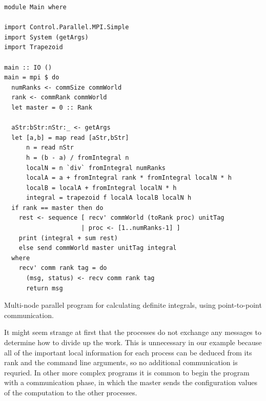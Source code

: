 \documentclass{tmr}
\newcommand{\Todo}[1]{{\textbf{Todo: #1}}}
\begin{document}
\begin{listing}
\begin{Verbatim}
module Main where

import Control.Parallel.MPI.Simple
import System (getArgs)
import Trapezoid

main :: IO ()
main = mpi $ do
  numRanks <- commSize commWorld
  rank <- commRank commWorld
  let master = 0 :: Rank

  aStr:bStr:nStr:_ <- getArgs
  let [a,b] = map read [aStr,bStr]
      n = read nStr
      h = (b - a) / fromIntegral n
      localN = n `div` fromIntegral numRanks
      localA = a + fromIntegral rank * fromIntegral localN * h
      localB = localA + fromIntegral localN * h
      integral = trapezoid f localA localB localN h
  if rank == master then do
    rest <- sequence [ recv' commWorld (toRank proc) unitTag
                     | proc <- [1..numRanks-1] ]
    print (integral + sum rest)
    else send commWorld master unitTag integral
  where
    recv' comm rank tag = do
      (msg, status) <- recv comm rank tag
      return msg
\end{Verbatim}
\caption{Multi-node parallel program for calculating definite
  integrals, using point-to-point communication. \label{mpi-p2p}}
\end{listing}


It might seem strange at first that the processes do not exchange any
messages to determine how to divide up the work.
This is unnecessary in our example because all of the important
local information for each process can be deduced from its rank and
the command line arguments, so no additional communication is requried.
In other more complex programs it is common to begin the program with
a communication phase, in which the master sends the configuration
values of the computation to the other processes.
\end{document}
